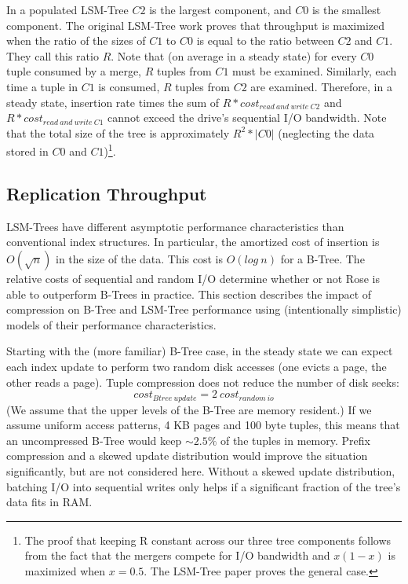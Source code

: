 \documentclass{vldb}
\newcommand{\rows}{Rose\xspace}
\begin{document}
In a populated LSM-Tree $C2$ is the largest component, and $C0$ is the
smallest component.  The original LSM-Tree work proves that throughput
is maximized when the ratio of the sizes of $C1$ to $C0$ is equal to
the ratio between $C2$ and $C1$.  They call this ratio $R$.  Note that
(on average in a steady state) for every $C0$ tuple consumed by a
merge, $R$ tuples from $C1$ must be examined.  Similarly, each time a
tuple in $C1$ is consumed, $R$ tuples from $C2$ are examined.
Therefore, in a steady state, insertion rate times the sum of $R *
cost_{read~and~write~C2}$ and $R * cost_{read~and~write~C1}$ cannot
exceed the drive's sequential I/O bandwidth.  Note that the total size
of the tree is approximately $R^2 * |C0|$ (neglecting the data stored
in $C0$ and $C1$)\footnote{The proof that keeping R constant across
  our three tree components follows from the fact that the mergers
  compete for I/O bandwidth and $x(1-x)$ is maximized when $x=0.5$.
  The LSM-Tree paper proves the general case.}.

\subsection{Replication Throughput}

LSM-Trees have different asymptotic performance characteristics than
conventional index structures.  In particular, the amortized cost of
insertion is $O(\sqrt{n})$ in the size of the data.  This cost is
$O(log~n)$ for a B-Tree.  The relative costs of sequential and random
I/O determine whether or not \rows is able to outperform B-Trees in
practice.  This section describes the impact of compression on B-Tree
and LSM-Tree performance using (intentionally simplistic) models of
their performance characteristics.

Starting with the (more familiar) B-Tree case, in the steady state we
can expect each index update to perform two random disk accesses (one
evicts a page, the other reads a page).  Tuple compression does not
reduce the number of disk seeks:
\[
   cost_{Btree~update}=2~cost_{random~io}
\]
(We assume that the upper levels of the B-Tree are memory resident.)  If
we assume uniform access patterns, 4 KB pages and 100 byte tuples,
this means that an uncompressed B-Tree would keep $\sim2.5\%$ of the
tuples in memory.  Prefix compression and a skewed update distribution
would improve the situation significantly, but are not considered
here.  Without a skewed update distribution, batching I/O into
sequential writes only helps if a significant fraction of the tree's
data fits in RAM.
\end{document}

